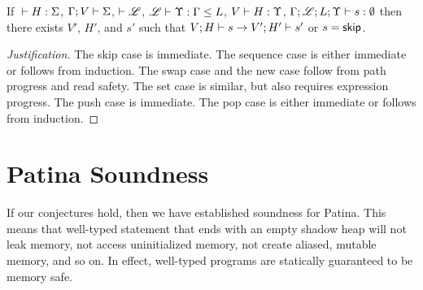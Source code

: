\begin{conj}
  If ${} \vdash {H} : {\Sigma}$, $\Gamma;V\vdash\Sigma$, $\vdash\mathscr{L}$, ${\mathscr{L}} \vdash {\Upsilon} : {\Gamma} \leq {L}$,
  ${V} \vdash {H} : {\Upsilon}$, ${\Gamma;\mathscr{L};L;\Upsilon} \vdash {s} : {\emptyset}$
  then there exists $V'$, $H'$, and $s'$ such that ${V};{H}\vdash{s}\to{V'};{H'}\vdash{s'}$
  or $s = \mathsf{skip}$.
\end{conj}

\begin{proof}[Justification]
  The skip case is immediate.
  The sequence case is either immediate or follows from induction.
  The swap case and the new case follow from path progress and read safety.
  The set case is similar, but also requires expression progress.
  The push case is immediate.
  The pop case is either immediate or follows from induction.
\end{proof}

\section*{Patina Soundness}
If our conjectures hold, then we have established soundness for Patina.
This means that well-typed statement that ends with an empty shadow heap
will not leak memory, not access uninitialized memory, not create aliased, mutable memory,
and so on. In effect, well-typed programs are statically guaranteed to be memory safe.
